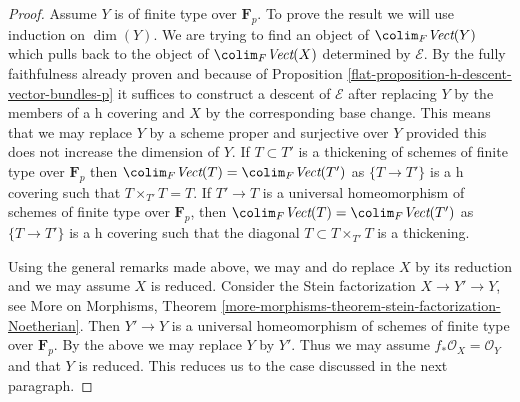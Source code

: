 \begin{proof}
\medskip\noindent
Assume $Y$ is of finite type over $\mathbf{F}_p$.
To prove the result we will use induction on $\dim(Y)$.
We are trying to find an object of
$\colim_F \textit{Vect}(Y)$ which pulls back to the
object of $\colim_F \textit{Vect}(X)$ determined by $\mathcal{E}$.
By the fully faithfulness already proven and because of
Proposition \ref{flat-proposition-h-descent-vector-bundles-p}
it suffices to construct a descent of $\mathcal{E}$
after replacing $Y$ by the members of a h covering
and $X$ by the corresponding base change. This means
that we may replace $Y$ by a scheme proper and surjective
over $Y$ provided this does not increase the dimension of $Y$.
If $T \subset T'$ is a thickening of schemes of finite type
over $\mathbf{F}_p$ then
$\colim_F \textit{Vect}(T) = \colim_F \textit{Vect}(T')$
as $\{T \to T'\}$ is a h covering such that $T \times_{T'} T = T$.
If $T' \to T$ is a universal homeomorphism of schemes
of finite type over $\mathbf{F}_p$, then
$\colim_F \textit{Vect}(T) = \colim_F \textit{Vect}(T')$
as $\{T \to T'\}$ is a h covering such that the diagonal
$T \subset T \times_{T'} T$ is a thickening.

\medskip\noindent
Using the general remarks made above, we may and do replace
$X$ by its reduction and we may assume $X$ is reduced.
Consider the Stein factorization $X \to Y' \to Y$, see
More on Morphisms, Theorem
\ref{more-morphisms-theorem-stein-factorization-Noetherian}.
Then $Y' \to Y$ is a universal homeomorphism
of schemes of finite type over $\mathbf{F}_p$.
By the above we may replace $Y$ by $Y'$.
Thus we may assume $f_*\mathcal{O}_X = \mathcal{O}_Y$
and that $Y$ is reduced. This reduces us to the case discussed
in the next paragraph.


\end{proof}
